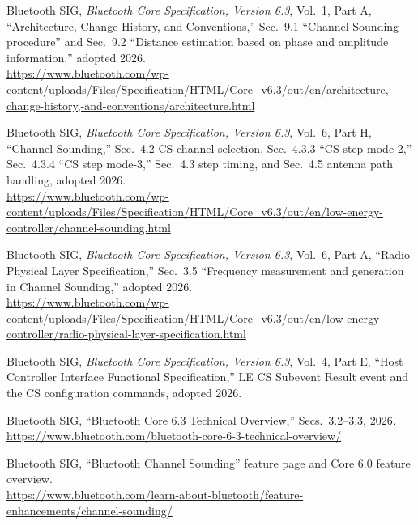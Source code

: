 \documentclass[11pt,a4paper]{article}
\begin{document}
\begin{enumerate}[label={[\arabic*]},leftmargin=2.2em,itemsep=3pt]
\item Bluetooth SIG, \emph{Bluetooth Core Specification, Version 6.3}, Vol.\ 1, Part A,
  ``Architecture, Change History, and Conventions,'' Sec.\ 9.1 ``Channel Sounding procedure'' and
  Sec.\ 9.2 ``Distance estimation based on phase and amplitude information,'' adopted 2026.\\
  {\small\url{https://www.bluetooth.com/wp-content/uploads/Files/Specification/HTML/Core_v6.3/out/en/architecture,-change-history,-and-conventions/architecture.html}}

\item Bluetooth SIG, \emph{Bluetooth Core Specification, Version 6.3}, Vol.\ 6, Part H,
  ``Channel Sounding,'' Sec.\ 4.2 CS channel selection, Sec.\ 4.3.3 ``CS step mode-2,''
  Sec.\ 4.3.4 ``CS step mode-3,'' Sec.\ 4.3 step timing, and Sec.\ 4.5 antenna path handling,
  adopted 2026.\\
  {\small\url{https://www.bluetooth.com/wp-content/uploads/Files/Specification/HTML/Core_v6.3/out/en/low-energy-controller/channel-sounding.html}}

\item Bluetooth SIG, \emph{Bluetooth Core Specification, Version 6.3}, Vol.\ 6, Part A,
  ``Radio Physical Layer Specification,'' Sec.\ 3.5 ``Frequency measurement and generation in
  Channel Sounding,'' adopted 2026.\\
  {\small\url{https://www.bluetooth.com/wp-content/uploads/Files/Specification/HTML/Core_v6.3/out/en/low-energy-controller/radio-physical-layer-specification.html}}

\item Bluetooth SIG, \emph{Bluetooth Core Specification, Version 6.3}, Vol.\ 4, Part E,
  ``Host Controller Interface Functional Specification,'' LE CS Subevent Result event and the CS
  configuration commands, adopted 2026.

\item Bluetooth SIG, ``Bluetooth Core 6.3 Technical Overview,'' Secs.\ 3.2--3.3, 2026.\\
  {\small\url{https://www.bluetooth.com/bluetooth-core-6-3-technical-overview/}}

\item Bluetooth SIG, ``Bluetooth Channel Sounding'' feature page and Core 6.0 feature overview.\\
  {\small\url{https://www.bluetooth.com/learn-about-bluetooth/feature-enhancements/channel-sounding/}}


\end{enumerate}
\end{document}
